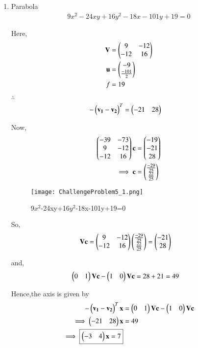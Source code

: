 \documentclass[journal,12pt,twocolumn]{IEEEtran}
\begin{document}
\begin{enumerate}
    \item Parabola
    \begin{align}
    9x^2-24xy+16y^2-18x-101y+19 = 0
    \end{align}
    
    Here,
    \begin{align}
    \mathbf{V} &= \begin{pmatrix}9 & -12 \\ -12 & 16\end{pmatrix} \\
    \mathbf{u} &= \begin{pmatrix}-9 \\ \frac{-101}{2}\end{pmatrix} \\
    f &= 19
    \end{align}

    $\therefore$
    \begin{align}
    -\begin{pmatrix}\mathbf{v_1}-\mathbf{v_2}\end{pmatrix}^T &= \begin{pmatrix}-21 & 28\end{pmatrix}
    \end{align}

    Now,
    \begin{align}
    \begin{pmatrix}-39 & -73 \\ 9 & -12 \\ -12 & 16\end{pmatrix}\mathbf{c} &= \begin{pmatrix}-19 \\ -21 \\ 28\end{pmatrix}
    \\
    \implies \mathbf{c} &= \begin{pmatrix}\frac{-29}{25} \\ \frac{22}{25}\end{pmatrix}
    \end{align}
    
    \begin{figure}[!ht]
    \centering
    \texttt{[image: ChallengeProblem5\_1.png]}
    \caption{9$x^2$-24xy+16$y^2$-18x-101y+19=0}
    \label{ex1}	
    \end{figure}

    So,
    \begin{align}
    \mathbf{V}\mathbf{c} &= \begin{pmatrix}9 & -12 \\ -12 & 16\end{pmatrix}\begin{pmatrix}\frac{-29}{25} \\ \frac{22}{25}\end{pmatrix}=\begin{pmatrix}-21 \\ 28\end{pmatrix}
    \end{align}

    and,
    \begin{align}
    \begin{pmatrix}0 & 1\end{pmatrix}\mathbf{V}\mathbf{c} - \begin{pmatrix}1&0\end{pmatrix}\mathbf{V}\mathbf{c} &= 28+21=49
    \end{align}

    Hence,the axis is given by
    \begin{align}
    -\begin{pmatrix}\mathbf{v_1}-\mathbf{v_2}\end{pmatrix}^T\mathbf{x} &= \begin{pmatrix}0 & 1\end{pmatrix}\mathbf{V}\mathbf{c} - \begin{pmatrix}1 & 0\end{pmatrix}\mathbf{V}\mathbf{c} \\
    \implies \begin{pmatrix}-21 & 28\end{pmatrix}\mathbf{x} &= 49
    \\
    \implies \boxed{\begin{pmatrix}-3 & 4\end{pmatrix}\mathbf{x} = 7}
    \end{align}
    

\end{enumerate}
\end{document}
